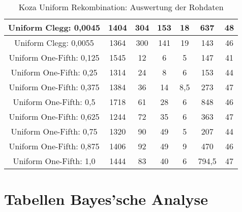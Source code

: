 \begin{table}[H]
\begin{tabular}{c | c | c | c | c | c | c}
		\hline
		Uniform Clegg: 0,0045 & 1404 & 304 & 153 & 18 & 637 & 48\\
		\hline
		Uniform Clegg: 0,0055 & 1364 & 300 & 141 & 19 & 143 & 46\\
		\hline
		\hline
		Uniform One-Fifth: 0,125 & 1545 & 12 & 6 & 5 & 147 & 41\\
		\hline
		Uniform One-Fifth: 0,25 & 1314 & 24 & 8 & 6 & 153 & 44\\
		\hline
		Uniform One-Fifth: 0,375 & 1384 & 36 & 14 & 8,5 & 273 & 47\\
		\hline
		Uniform One-Fifth: 0,5 & 1718 & 61 & 28 & 6 & 848 & 46\\
		\hline
		Uniform One-Fifth: 0,625 & 1244 & 72 & 35 & 6 & 363 & 47\\
		\hline
		Uniform One-Fifth: 0,75 & 1320 & 90 & 49 & 5 & 207 & 44\\
		\hline
		Uniform One-Fifth: 0,875 & 1406 & 92 & 49 & 9 & 470 & 46\\
		\hline
		Uniform One-Fifth: 1,0 & 1444 & 83 & 40 & 6 & 794,5 & 47\\
	\end{tabular}
	\caption{Koza Uniform Rekombination: Auswertung der Rohdaten}
	\label{table:kozaUniformRohdaten}
\end{table} 
\section{Tabellen Bayes'sche Analyse}
\label{sec:appendixTabellenBayes}
